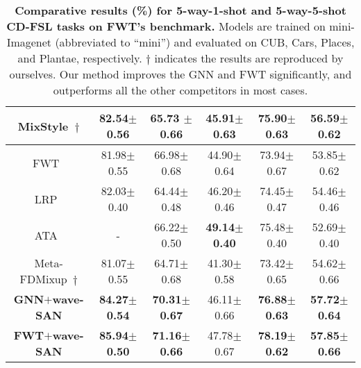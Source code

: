 \documentclass{article}
\newcommand{\mypm}{\scriptsize$\pm$}
\begin{document}
\begin{table*}[!t]
\begin{center}
\begin{tabular} { c c c c c c}
				MixStyle~\cite{zhou2021domain}$\dagger$   & 82.54\mypm0.56 & 65.73 \mypm 0.66 &	45.91\mypm0.63 & 75.90\mypm0.63 & 56.59\mypm0.62  \\
		
				\hline
				
				






				
FWT~\cite{tseng2020cross}  
				& 81.98\mypm0.55 
				& 66.98\mypm0.68 
				& 44.90\mypm0.64 
				& 73.94\mypm0.67 
				& 53.85\mypm0.62 \\
				
				LRP~\cite{sun2021explanation} 
				& 82.03\mypm0.40 
				& 64.44\mypm0.48 
				& 46.20\mypm0.46 
				& 74.45\mypm0.47 
				& 54.46\mypm0.46 \\
				
				ATA~\cite{wang2021cross} & - & 66.22\mypm0.50 & \textbf{49.14\mypm0.40} & 75.48\mypm0.40 & 52.69\mypm0.40 \\
				
				Meta-FDMixup~\cite{fu2021meta}$\dagger$ & 81.07\mypm 0.55 & 64.71\mypm 0.68 & 41.30\mypm 0.58	& 73.42\mypm0.65	& 54.62\mypm 0.66 \\
				
\hline
				
\textbf{GNN$+$wave-SAN} & \textbf{ 84.27\mypm0.54 } & \textbf{ 70.31\mypm0.67 } & 
				46.11\mypm0.66 & 
				\textbf{ 76.88\mypm0.63 } & \textbf{ 57.72\mypm0.64 }\\
						
				\textbf{FWT$+$wave-SAN} & 
				\textbf{ 85.94\mypm0.50 } & \textbf{ 71.16\mypm0.66 } & 
				47.78\mypm0.67 & 
				\textbf{ 78.19\mypm0.62 } & \textbf{ 57.85\mypm0.66} \\		
				\bottomrule
			\end{tabular}
		\end{center}
\caption{\textbf{Comparative results (\%) for 5-way-1-shot and 5-way-5-shot CD-FSL tasks on FWT's benchmark.} Models are trained on mini-Imagenet (abbreviated to ``mini'') and evaluated on CUB, Cars, Places, and Plantae, respectively.  $\dagger$ indicates the results are reproduced by ourselves. Our method improves the GNN and FWT significantly, and outperforms all the other competitors in most cases.} \label{tab-main-result}
\end{table*}
\end{document}
